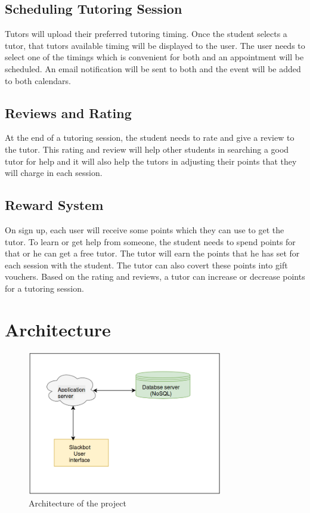 \documentclass{sig-alternate-05-2015}
\begin{document}
\subsection{Scheduling Tutoring Session}
Tutors will upload their preferred tutoring timing. Once the student selects a tutor, that tutors available timing will be displayed to the user. The user needs to select one of the timings which is convenient for both and an appointment will be scheduled. An email notification will be sent to both and the event will be added to both calendars.
\linebreak
\subsection{Reviews and Rating}
At the end of a tutoring session, the student needs to rate and give a review to the tutor. This rating and review will help other students in searching a good tutor for help and it will also help the tutors in adjusting their points that they will charge in each session. 

\subsection{Reward System}
On sign up, each user will receive some points which they can use to get the tutor. To learn or get help from someone, the student needs to spend points for that or he can get a free tutor. The tutor will earn the points that he has set for each session with the student. The tutor can also covert these points into gift vouchers. Based on the rating and reviews, a tutor can increase or decrease points for a tutoring session.

\section{Architecture}
\begin{figure}[ht]
\centering
\includegraphics[width=85mm]{pic.png}
\caption{Architecture of the project}
\end{figure}
\end{document}
